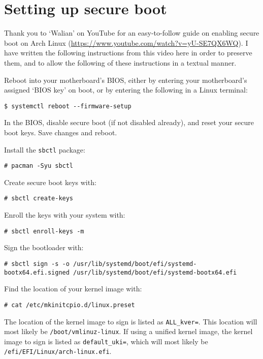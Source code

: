 \documentclass[a4paper]{article}
\begin{document}
\section{Setting up secure boot}

Thank you to `Walian' on YouTube for an easy-to-follow guide on enabling secure boot on Arch Linux (\url{https://www.youtube.com/watch?v=yU-SE7QX6WQ}).
I have written the following instructions from this video here in order to preserve them, and to allow the following of these instructions in a textual manner.

Reboot into your motherboard's BIOS, either by entering your motherboard's assigned `BIOS key' on boot, or by entering the following in a Linux terminal:
\begin{lstlisting}
$ systemctl reboot --firmware-setup
\end{lstlisting}

In the BIOS, disable secure boot (if not disabled already), and reset your secure boot keys.
Save changes and reboot.

Install the \lstinline|sbctl| package:
\begin{lstlisting}
# pacman -Syu sbctl
\end{lstlisting}

Create secure boot keys with:
\begin{lstlisting}
# sbctl create-keys
\end{lstlisting}

Enroll the keys with your system with:
\begin{lstlisting}
# sbctl enroll-keys -m
\end{lstlisting}

Sign the bootloader with:
\begin{lstlisting}
# sbctl sign -s -o /usr/lib/systemd/boot/efi/systemd-bootx64.efi.signed /usr/lib/systemd/boot/efi/systemd-bootx64.efi
\end{lstlisting}

Find the location of your kernel image with:
\begin{lstlisting}
# cat /etc/mkinitcpio.d/linux.preset 
\end{lstlisting}

The location of the kernel image to sign is listed as \lstinline|ALL_kver=|.
This location will most likely be \lstinline|/boot/vmlinuz-linux|.
If using a unified kernel image, the kernel image to sign is listed as \lstinline|default_uki=|, which will most likely be \lstinline|/efi/EFI/Linux/arch-linux.efi|.
\end{document}
